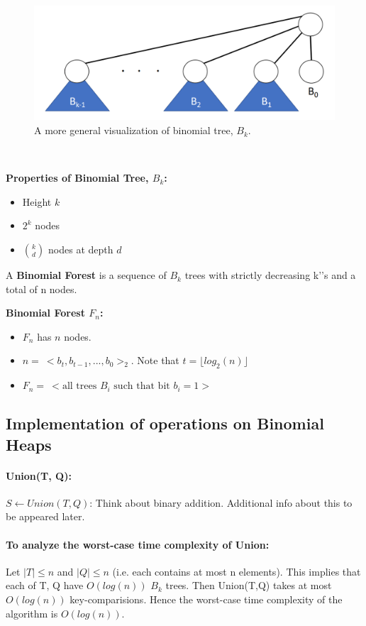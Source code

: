 \documentclass{article}
\begin{document}
\begin{figure}[h]
\begin{center}\includegraphics[scale=0.8]{image009.png}\end{center}
\caption{A more general visualization of binomial tree,  $B_k$.}
\end{figure}
\\
\begin{framed}
\textbf{Properties of Binomial Tree, $B_k$: }
\begin{itemize}
  \item Height $k$
  \item $2^k$ nodes
  \item $\binom{k}{d}$ nodes at depth $d$
\end{itemize}
\end{framed}
A \textbf{Binomial Forest} is a sequence of $B_k$ trees with strictly decreasing k’'s and a total of n nodes.
\begin{framed}
\textbf{Binomial Forest $F_n$: }
\begin{itemize}
\item $F_n$ has $n$ nodes.
\item $n =\  <b_t,b_{t-1},...,b_0>_2.$ Note that $t = \lfloor log_2(n) \rfloor$
\item $F_n =\ <\text{all trees $B_i$ such that bit $b_i = 1$}>$
\end{itemize}
\end{framed}
\noindent
\subsection{Implementation of operations on Binomial Heaps}
\paragraph{Union(T, Q): }$S \gets Union (T, Q)$: Think about binary addition. Additional info about this to be appeared later.  
\paragraph{To analyze the worst-case time complexity of Union: }
Let $|T| \leq n$ and $|Q| \leq n$ (i.e. each contains at most n elements). This implies that each of T, Q have $O(log(n))$ $B_k$ trees. Then Union(T,Q) takes at most $O(log(n))$ key-comparisions. Hence the worst-case time complexity of the algorithm is $O(log(n))$. 
\end{document}
